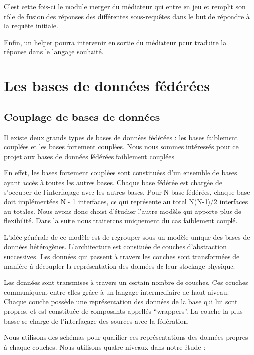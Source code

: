 C’est cette fois-ci le module merger du médiateur qui entre en jeu et remplit son rôle de fusion des réponses des différentes sous-requêtes dans le but de répondre à la requête initiale.

Enfin, un helper pourra intervenir en sortie du médiateur pour traduire la réponse dans le langage souhaité.

\section{Les bases de données fédérées}

\subsection{Couplage de bases de données}

Il existe deux grands types de bases de données fédérées : les bases faiblement couplées et les bases fortement couplées. Nous nous sommes intéressés pour ce projet aux bases de données fédérées faiblement couplées

En effet, les bases fortement couplées sont constituées d’un ensemble de bases ayant accès à toutes les autres bases. Chaque base fédérée est chargée de s’occuper de l’interfaçage avec les autres bases. Pour N base fédérées, chaque base doit implémentées N - 1 interfaces, ce qui représente au total N(N-1)/2 interfaces au totales. Nous avons donc choisi d’étudier l’autre modèle qui apporte plus de flexibilité. Dans la suite nous traiterons uniquement du cas faiblement couplé.

L’idée générale de ce modèle est de regrouper sous un modèle unique des bases de données hétérogènes. L’architecture est consituée de couches d’abstraction successives. Les données qui passent à travers les couches sont transformées de manière à découpler la représentation des données de leur stockage physique.

Les données sont transmises à travers un certain nombre de couches. Ces couches communiquent entre elles grâce à un langage intermédiaire de haut niveau. Chaque couche possède une représentation des données de la base qui lui sont propres, et est constituée de composants appellés “wrappers”. La couche la plus basse se charge de l’interfaçage des sources avec la fédération.

Nous utilisons des schémas pour qualifier ces représentations des données propres à chaque couches. Nous utilisons quatre niveaux dans notre étude :

